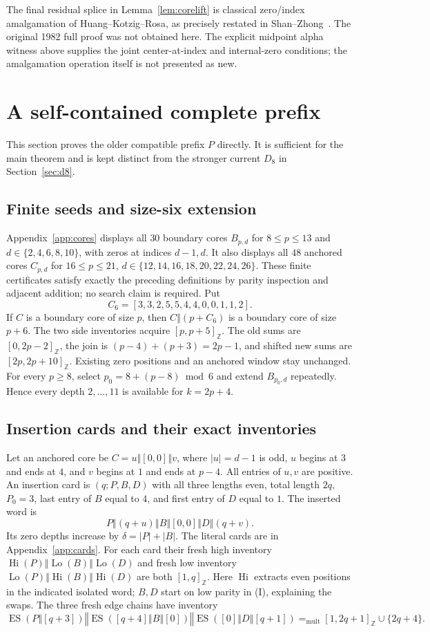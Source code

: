 \documentclass[11pt,a4paper]{article}
\theoremstyle{definition}\newtheorem{definition}[theorem]{Definition}
\theoremstyle{remark}\newtheorem{remark}[theorem]{Remark}
\newcommand{\cat}{\mathbin{\Vert}}
\newcommand{\ints}[2]{[#1,#2]_{\mathbb Z}}
\newcommand{\ES}{\operatorname{ES}}
\newcommand{\Hi}{\operatorname{Hi}}
\newcommand{\Lo}{\operatorname{Lo}}
\newcommand{\mult}{\mathrel{=_{\mathrm{mult}}}}
\begin{document}

The final residual splice in Lemma~\ref{lem:corelift} is classical
zero/index amalgamation of Huang--Kotzig--Rosa, as precisely restated
in Shan--Zhong~\cite[Lemma 1]{sz}. The original 1982 full proof was
not obtained here. The explicit midpoint alpha witness above supplies
the joint center-at-index and internal-zero conditions; the
amalgamation operation itself is not presented as new.

\section{A self-contained complete prefix}
\label{sec:prefix}
This section proves the older compatible prefix $P$ directly. It is
sufficient for the main theorem and is kept distinct from the stronger
current $D_8$ in Section~\ref{sec:d8}.

\subsection{Finite seeds and size-six extension}
Appendix~\ref{app:cores} displays all $30$ boundary cores
$B_{p,d}$ for $8\le p\le13$ and $d\in\{2,4,6,8,10\}$, with zeros
at indices $d-1,d$. It also displays all $48$ anchored cores $C_{p,d}$
for $16\le p\le21$, $d\in\{12,14,16,18,20,22,24,26\}$.
These finite certificates satisfy exactly the preceding definitions by
parity inspection and adjacent addition; no search claim is required.
Put
\[
 C_6=[3,3,2,5,5,4,4,0,0,1,1,2].
\]
If $C$ is a boundary core of size $p$, then
$C\cat(p+C_6)$ is a boundary core of size $p+6$.
The two side inventories acquire $\ints p{p+5}$.
The old sums are $\ints0{2p-2}$, the join is
$(p-4)+(p+3)=2p-1$, and shifted new sums are $\ints{2p}{2p+10}$.
Existing zero positions and an anchored window stay unchanged.
For every $p\ge8$, select $p_0=8+(p-8)\bmod6$ and extend
$B_{p_0,d}$ repeatedly. Hence every depth $2,\ldots,11$ is available
for $k=2p+4$.

\subsection{Insertion cards and their exact inventories}
Let an anchored core be $C=u\cat[0,0]\cat v$, where $|u|=d-1$ is
odd, $u$ begins at $3$ and ends at $4$, and $v$ begins at $1$ and ends
at $p-4$. All entries of $u,v$ are positive. An insertion card is
$(q;P,B,D)$ with all three lengths even, total length $2q$,
$P_0=3$, last entry of $B$ equal to $4$, and first entry of $D$ equal to
$1$. The inserted word is
\[
 P\cat(q+u)\cat B\cat[0,0]\cat D\cat(q+v).             \tag{I}
\]
Its zero depths increase by $\delta=|P|+|B|$.
The literal cards are in Appendix~\ref{app:cards}.
For each card their fresh high inventory
$\Hi(P)\cat\Lo(B)\cat\Lo(D)$ and fresh low inventory
$\Lo(P)\cat\Hi(B)\cat\Hi(D)$ are both $\ints1q$.
Here $\Hi$ extracts even positions in the indicated isolated word;
$B,D$ start on low parity in (I), explaining the swaps.
The three fresh edge chains have inventory
\[
 \ES(P\cat[q+3])\cat
 \ES([q+4]\cat B\cat[0])\cat
 \ES([0]\cat D\cat[q+1])
 \mult\ints1{2q+1}\cup\{2q+4\}.                       \tag{J}
\]
\end{document}
